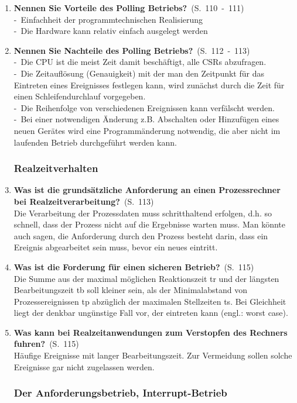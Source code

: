 \documentclass[a4paper,12pt]{article}
\newcommand{\question}[3]{\pagebreak[3]\item {\textbf{#1?}}\ (S.\ #2)#3}
\newcommand{\catchword}[1]{\\-\ #1}
\newcommand{\normaltext}[1]{\\#1}
\newcommand{\page}[1]{#1}
\newcommand{\pages}[2]{#1\ -\ #2}
\begin{document}
\begin{enumerate}
  \question{Nennen Sie Vorteile des Polling Betriebs}{\pages{110}{111}}
  {
    \catchword{Einfachheit der programmtechnischen Realisierung}
    \catchword{Die Hardware kann relativ einfach ausgelegt werden}
  }

  \question{Nennen Sie Nachteile des Polling Betriebs}{\pages{112}{113}}
  {
    \catchword{Die CPU ist die meist Zeit damit beschäftigt, alle CSRs abzufragen.}
    \catchword{Die Zeitauflösung (Genauigkeit) mit der man den Zeitpunkt für das Eintreten
               eines Ereignisses festlegen kann, wird zunächst durch die Zeit für einen Schleifendurchlauf
               vorgegeben.}
    \catchword{Die Reihenfolge von verschiedenen Ereignissen kann verfälscht werden.}
    \catchword{Bei einer notwendigen Änderung z.B. Abschalten oder Hinzufügen eines neuen
               Gerätes wird eine Programmänderung notwendig, die aber nicht im laufenden Betrieb 
               durchgeführt werden kann.}
  }

  \subsubsection{Realzeitverhalten}

  \question{Was ist die grundsätzliche Anforderung an einen Prozessrechner bei
            Realzeitverarbeitung}{\page{113}}
  {
    \normaltext{Die Verarbeitung der Prozessdaten muss schritthaltend erfolgen, d.h. so schnell,
                dass der Prozess nicht auf  die Ergebnisse warten muss. Man könnte auch sagen,
                die Anforderung durch den Prozess besteht darin, dass ein Ereignis abgearbeitet sein muss,
                bevor ein neues eintritt.}
  }

  \question{Was ist die Forderung für einen sicheren Betrieb}{\page{115}}
  {
    \normaltext{Die Summe aus der maximal möglichen Reaktionszeit tr und der längsten Bearbeitungszeit tb
                soll kleiner sein, als der Minimalabstand von Prozessereignissen tp abzüglich der maximalen 
                Stellzeiten ts. Bei Gleichheit liegt der denkbar ungünstige Fall vor, der eintreten kann
                (engl.: worst case).}
  }

  \question{Was kann bei Realzeitanwendungen zum Verstopfen des Rechners fuhren}{\page{115}}
  {
    \normaltext{Häufige Ereignisse mit langer Bearbeitungszeit. Zur Vermeidung sollen solche Ereignisse gar 
                nicht zugelassen werden.}
  }

  \subsubsection{Der Anforderungsbetrieb, Interrupt-Betrieb}


\end{enumerate}
\end{document}
